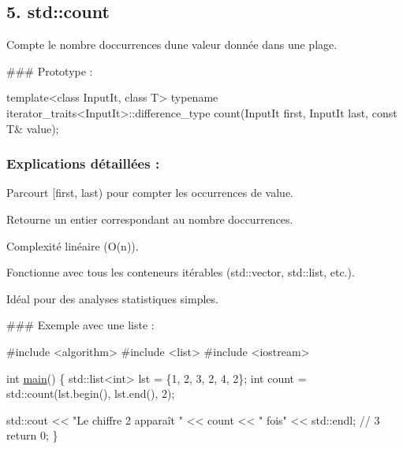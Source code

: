 \subsection*{5. {\bfseries std\+::count}}

Compte le nombre d\textquotesingle{}occurrences d\textquotesingle{}une valeur donnée dans une plage.

\#\#\# Prototype \+: 
\begin{DoxyCode}
\textcolor{keyword}{template}<\textcolor{keyword}{class} InputIt, \textcolor{keyword}{class} T>
\textcolor{keyword}{typename} iterator\_traits<InputIt>::difference\_type
count(InputIt first, InputIt last, \textcolor{keyword}{const} T& value);
\end{DoxyCode}


\subsubsection*{Explications détaillées \+:}


\begin{DoxyItemize}
\item Parcourt {\ttfamily \mbox{[}first, last)} pour compter les occurrences de {\ttfamily value}.
\item Retourne un entier correspondant au nombre d\textquotesingle{}occurrences.
\item Complexité linéaire (O(n)).
\item Fonctionne avec tous les conteneurs itérables ({\ttfamily std\+::vector}, {\ttfamily std\+::list}, etc.).
\item Idéal pour des analyses statistiques simples.
\end{DoxyItemize}

\#\#\# Exemple avec une liste \+: 
\begin{DoxyCode}
\textcolor{preprocessor}{#include <algorithm>}
\textcolor{preprocessor}{#include <list>}
\textcolor{preprocessor}{#include <iostream>}

\textcolor{keywordtype}{int} \hyperlink{htop_8c_a3c04138a5bfe5d72780bb7e82a18e627}{main}() \{
    std::list<int> lst = \{1, 2, 3, 2, 4, 2\};
    \textcolor{keywordtype}{int} count = std::count(lst.begin(), lst.end(), 2);

    std::cout << \textcolor{stringliteral}{"Le chiffre 2 apparaît "} << count << \textcolor{stringliteral}{" fois"} << std::endl; \textcolor{comment}{// 3}
    \textcolor{keywordflow}{return} 0;
\}
\end{DoxyCode}
 



